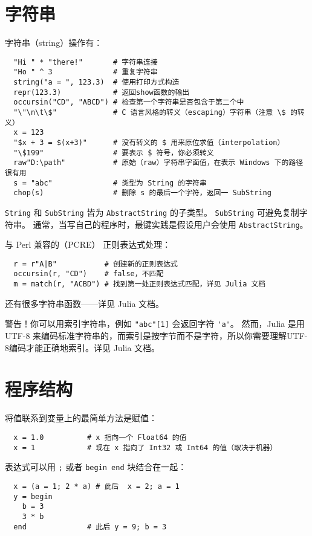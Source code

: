 \documentclass[10pt,a4paper]{article}
\begin{document}
\section{字符串}
字符串（string）操作有：
\begin{lstlisting}
  "Hi " * "there!"       # 字符串连接
  "Ho " ^ 3              # 重复字符串
  string("a = ", 123.3)  # 使用打印方式构造
  repr(123.3)            # 返回show函数的输出
  occursin("CD", "ABCD") # 检查第一个字符串是否包含于第二个中
  "\"\n\t\$"             # C 语言风格的转义（escaping）字符串（注意 \$ 的转义）
  x = 123
  "$x + 3 = $(x+3)"      # 没有转义的 $ 用来原位求值（interpolation）
  "\$199"                # 要表示 $ 符号，你必须转义
  raw"D:\path"           # 原始（raw）字符串字面值，在表示 Windows 下的路径很有用
  s = "abc"              # 类型为 String 的字符串
  chop(s)                # 删除 s 的最后一个字符，返回一 SubString
\end{lstlisting}

\lstinline|String| 和 \lstinline|SubString| 皆为 \lstinline|AbstractString| 的子类型。
\lstinline|SubString| 可避免复制字符串。
通常，当写自己的程序时，最键实践是假设用户会使用 \lstinline|AbstractString|。

与 Perl 兼容的（PCRE） 正则表达式处理：
\begin{lstlisting}
  r = r"A|B"           # 创建新的正则表达式
  occursin(r, "CD")    # false，不匹配
  m = match(r, "ACBD") # 找到第一处正则表达式匹配，详见 Julia 文档
\end{lstlisting}

还有很多字符串函数——详见 Julia 文档。

警告！你可以用索引字符串，例如 \lstinline|"abc"[1]| 会返回字符 \lstinline|'a'|。
然而，Julia 是用 UTF-8 来编码标准字符串的，而索引是按字节而不是字符，所以你需要理解UTF-8编码才能正确地索引。详见 Julia 文档。

\section{程序结构}
将值联系到变量上的最简单方法是赋值：
\begin{lstlisting}
  x = 1.0          # x 指向一个 Float64 的值
  x = 1            # 现在 x 指向了 Int32 或 Int64 的值（取决于机器）
\end{lstlisting}

表达式可以用 \lstinline|;| 或者 \lstinline|begin end| 块结合在一起：
\begin{lstlisting}
  x = (a = 1; 2 * a) # 此后  x = 2; a = 1
  y = begin
    b = 3
    3 * b
  end              # 此后 y = 9; b = 3
\end{lstlisting}
\end{document}
